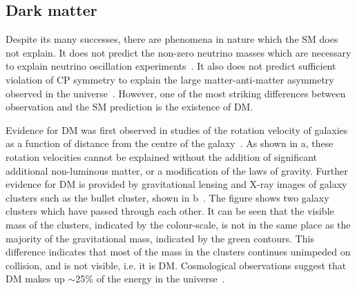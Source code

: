 \subsection{Dark matter}
\label{sec:DM}
Despite its many successes, there are phenomena in nature which the \ac{SM} does not explain. It does not predict the non-zero neutrino masses which are necessary to explain neutrino oscillation experiments~\cite{PhysRevLett.81.1158}. It also does not predict sufficient violation of CP symmetry to explain the large matter-anti-matter asymmetry observed in the universe~\cite{griffiths2008introduction}. However, one of the most striking differences between observation and the \ac{SM} prediction is the existence of \ac{DM}.

Evidence for \ac{DM} was first observed in studies of the rotation velocity of galaxies as a function of distance from the centre of the galaxy~\cite{Zwicky:1933gu}. As shown in a, these rotation velocities cannot be explained without the addition of significant additional non-luminous matter, or a modification of the laws of gravity. Further evidence for \ac{DM} is provided by gravitational lensing and X-ray images of galaxy clusters such as the bullet cluster, shown in b~\cite{1538-4357-648-2-L109}. The figure shows two galaxy clusters which have passed through each other. It can be seen that the visible mass of the clusters, indicated by the colour-scale, is not in the same place as the majority of the gravitational mass, indicated by the green contours. This difference indicates that most of the mass in the clusters continues unimpeded on collision, and is not visible, i.e. it is \ac{DM}. Cosmological observations suggest that \ac{DM} makes up $\sim$25\% of the energy in the universe~\cite{refId0}.

